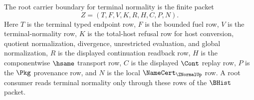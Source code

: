 \begin{definition}
\label{def:znormal-root-carrier-boundary}
The root carrier boundary for terminal normality is the finite packet
$$
Z=(T,F,V,K,R,H,C,P,N).
$$
Here $T$ is the terminal typed endpoint row, $F$ is the bounded fuel row, $V$ is the terminal-normality row, $K$ is the total-host refusal row for host conversion, quotient normalization, divergence, unrestricted evaluation, and global normalization, $R$ is the displayed continuation readback row, $H$ is the componentwise $\hsame$ transport row, $C$ is the displayed $\Cont$ replay row, $P$ is the $\Pkg$ provenance row, and $N$ is the local $\NameCert_{\ZNormalUp}$ row. A root consumer reads terminal normality only through these rows of the $\BHist$ packet.
\end{definition}


